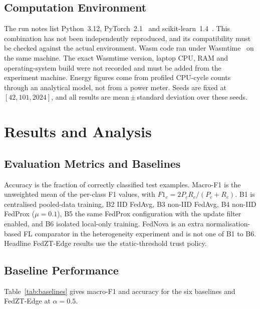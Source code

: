\documentclass[iicol,Numbered]{sn-jnl}
\begin{document}
\subsection{Computation Environment}

The run notes list Python~3.12, PyTorch~2.1~\cite{pytorch2019} and
scikit-learn~1.4~\cite{scikit2011}. This combination has not been independently
reproduced, and its compatibility must be checked against the actual
environment. Wasm code ran under Wasmtime~\cite{wasmtime2023} on the same
machine. The exact Wasmtime version, laptop CPU, RAM and operating-system build
were not recorded and must be added from the experiment machine. Energy figures
come from profiled CPU-cycle counts through an analytical model, not from a
power meter. Seeds are fixed at $[42,101,2024]$, and all results are mean\,$\pm$\,standard
deviation over these seeds.

\section{Results and Analysis}\label{sec:results}

\subsection{Evaluation Metrics and Baselines}

Accuracy is the fraction of correctly classified test examples. Macro-F1 is the
unweighted mean of the per-class F1 values, with $F1_c=2P_cR_c/(P_c+R_c)$. B1 is
centralised pooled-data training, B2 IID FedAvg, B3 non-IID FedAvg, B4 non-IID
FedProx ($\mu=0.1$), B5 the same FedProx configuration with the update filter
enabled, and B6 isolated local-only training. FedNova is an extra
normalisation-based FL comparator in the heterogeneity experiment and is not one
of B1 to B6. Headline FedZT-Edge results use the static-threshold trust policy.

\subsection{Baseline Performance}

Table~\ref{tab:baselines} gives macro-F1 and accuracy for the six baselines and
FedZT-Edge at $\alpha=0.5$.
\end{document}
